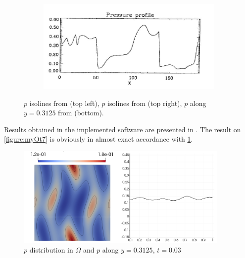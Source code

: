 \begin{figure}[H]
\\
\begin{subfigure}[b]{0.75\textwidth}\includegraphics[width=\textwidth]{img/ot/ref-zachary-pressure-profile.jpg}\end{subfigure}
\caption{$p$ isolines from \cite{blast1} (top left), $p$ isolines from \cite{blast0} (top right), $p$ along $y = 0.3125$ from \cite{blast0} (bottom).}
\label{figure:otRef}
\end{figure}

Results obtained in the implemented software are presented in . The result on \cref{figure:myOt7} is obviously in almost exact accordance with \cref{figure:otRef}.

\begin{figure}[H]
	\centering
	\includegraphics[width=0.92\textwidth]{img/ot/my1new.jpg}
\vspace{-2mm}
\caption{$p$ distribution in $\Omega$ and $p$ along $y = 0.3125$, $t = 0.03$}
\label{figure:myOt1}
\end{figure}
\vspace{-4mm}

